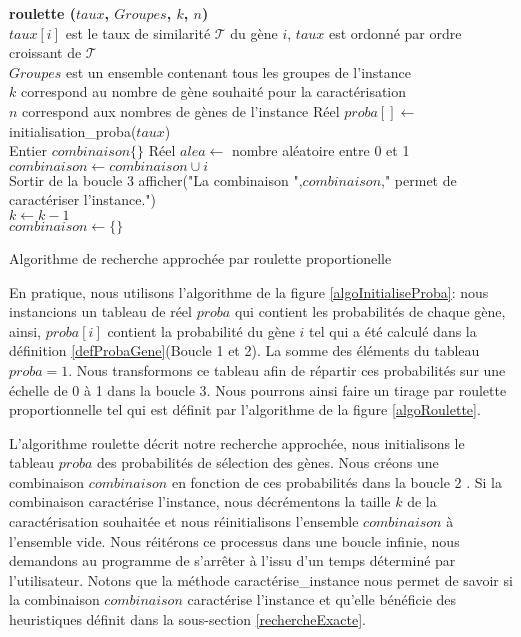 \begin{algorithm}
	\textbf{roulette ($taux$, $Groupes$, $k$, $n$)}\\
	\tcp
	{
		$taux[i]$ est le taux de similarité $\mathcal{T}$ du gène $i$, $taux$ est ordonné par ordre croissant de $\mathcal{T}$\\
		$Groupes$ est un ensemble contenant tous les groupes de l'instance\\
		$k$ correspond au nombre de gène souhaité pour la caractérisation\\
		$n$ correspond aux nombres de gènes de l'instance
	}
	Réel $proba[] \leftarrow$ initialisation\_proba($taux$)\\	
	{
		Entier $combinaison\{\}$ 		
		{
			Réel $alea \leftarrow $ nombre aléatoire entre 0 et 1 \\
			{
				{
					$combinaison \leftarrow combinaison \cup i$\\
					Sortir de la boucle 3
				}
			}
		}
		{
			afficher("La combinaison ",$combinaison$," permet de caractériser l'instance.")\\
			$k \leftarrow k-1$\\
			$combinaison \leftarrow \{\}$		
		}
	}
	\caption{Algorithme de recherche approchée par roulette proportionelle}
	\label{algoRoulette}
\end{algorithm}
		
En pratique, nous utilisons l'algorithme de la figure \ref{algoInitialiseProba}: nous instancions un tableau  de réel $proba$ qui contient les probabilités de chaque gène, ainsi, $proba[i]$ contient la probabilité du gène $i$ tel qui a été calculé dans la définition \ref{defProbaGene}(Boucle 1 et 2). La somme des éléments du tableau $proba = 1$. Nous transformons ce tableau afin de répartir ces probabilités sur une échelle de 0 à 1 dans la boucle 3. Nous pourrons ainsi faire un tirage par roulette proportionnelle tel qui est définit par l'algorithme de la figure \ref{algoRoulette}.

L'algorithme roulette décrit notre recherche approchée, nous initialisons le tableau $proba$ des probabilités de sélection des gènes. Nous créons une combinaison $combinaison$ en fonction de ces probabilités dans la boucle 2 . Si la combinaison caractérise l'instance, nous décrémentons la taille $k$ de la caractérisation souhaitée et nous réinitialisons l'ensemble $combinaison$ à l'ensemble vide. Nous réitérons ce processus dans une boucle infinie, nous demandons au programme de s'arrêter à l'issu d'un temps déterminé par l'utilisateur. Notons que la méthode caractérise\_instance nous permet de savoir si la combinaison $combinaison$ caractérise l'instance et qu'elle bénéficie des heuristiques définit dans la sous-section \ref{rechercheExacte}.

